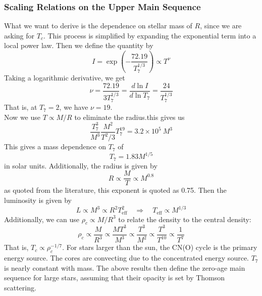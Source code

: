 \documentclass[10pt]{article}
\numberwithin{equation}{section}
\newcommand{\n}{\noindent}
\begin{document}
    \subsubsection{Scaling Relations on the Upper Main Sequence}
    \label{sec:scal-relat-upper}

    What we want to derive is
    the dependence on stellar mass of $R$, since we are asking for
    $T_c$. This process is simplified by expanding the exponential
    term into a local power law. Then we define the quantity by
    \begin{equation}
      \label{eq:180}
      I=\exp\left(-\frac{72.19}{T_7^{1/3}}\right)\propto T^\nu
    \end{equation}
    Taking a logarithmic derivative, we get
    \begin{equation}
      \label{eq:181}
      \nu=\frac{72.19}{3T_7^{1/3}}=\frac{d\ln I}{d\ln T_7}=\frac{24}{T_7^{1/3}}
    \end{equation}
    That is, at $T_7=2$, we have $\nu=19$.\\

    \n Now we use $T\propto M/R$ to eliminate the radius.this gives us
    \begin{equation}
      \label{eq:182}
      \frac{T_7^3}{M^3}\frac{M^2}{T^2/3}T_7^{19}=3.2\times 10^5\ M^3
    \end{equation}
    This gives a mass dependence on $T_7$ of
    \begin{equation}
      \label{eq:183}
      \boxed{T_7=1.83 M^{1/5}}
    \end{equation}
    in solar units. Additionally, the radius is given by
    \begin{equation}
      \label{eq:184}
      R\propto \frac{M}{T}\propto M^{0.8}
    \end{equation}
    as quoted from the literature, this exponent is quoted as
    0.75. Then the luminosity is given by
    \begin{equation}
      \label{eq:185}
      L\propto M^3\propto R^2T_{\mathrm{eff}}^2\quad\Rightarrow\quad
      T_{\mathrm{eff}}\propto M^{1/3}
    \end{equation}
    Additionally, we can use $\rho_c\propto M/R^3$ to relate the
    density to the central density:
    \begin{equation}
      \label{eq:186}
      \rho_c\propto \frac{M}{R^3}\propto \frac{M T^3}{M^3}\propto
      \frac{T^3}{M^2}\propto \frac{T^3}{T^{10}}\propto \frac{1}{T^7}
    \end{equation}
    That is, $T_c\propto \rho_c^{-1/7}$. For stars larger than the
    sun, the CN(O) cycle is the primary energy source. The cores are
    convecting due to the concentrated energy source. $T_7$ is nearly
    constant with mass. The above results then define the zero-age
    main sequence for large stars, assuming that their opacity is set
    by Thomson scattering.
\end{document}
